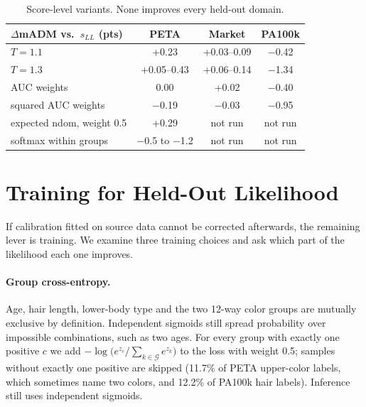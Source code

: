 \documentclass[10pt,twocolumn,letterpaper]{article}
\begin{document}
\begin{table}[t]
\centering\small
\setlength{\tabcolsep}{3pt}
\begin{tabular}{@{}lccc@{}}
\toprule
$\Delta$mADM vs.\ $s_{LL}$ (pts) & PETA & Market & PA100k \\
\midrule
$T=1.1$ & +0.23 & +0.03--0.09 & $-$0.42 \\
$T=1.3$ & +0.05--0.43 & +0.06--0.14 & $-$1.34 \\
AUC weights & 0.00 & +0.02 & $-$0.40 \\
squared AUC weights & $-$0.19 & $-$0.03 & $-$0.95 \\
expected ndom, weight 0.5 & +0.29 & not run & not run \\
softmax within groups & $-$0.5 to $-$1.2 & not run & not run \\
\bottomrule
\end{tabular}
\caption{Score-level variants. None improves every held-out domain.}
\label{tab:scores}
\end{table}

\section{Training for Held-Out Likelihood}
\label{sec:train}

If calibration fitted on source data cannot be corrected afterwards, the remaining lever is training. We examine three training choices and ask which part of the likelihood each one improves.

\paragraph{Group cross-entropy.} Age, hair length, lower-body type and the two 12-way color groups are mutually exclusive by definition. Independent sigmoids still spread probability over impossible combinations, such as two ages. For every group with exactly one positive $c$ we add $-\log\big(e^{z_c}/\sum_{k\in\mathcal G}e^{z_k}\big)$ to the loss with weight 0.5; samples without exactly one positive are skipped (11.7\% of PETA upper-color labels, which sometimes name two colors, and 12.2\% of PA100k hair labels). Inference still uses independent sigmoids.
\end{document}
